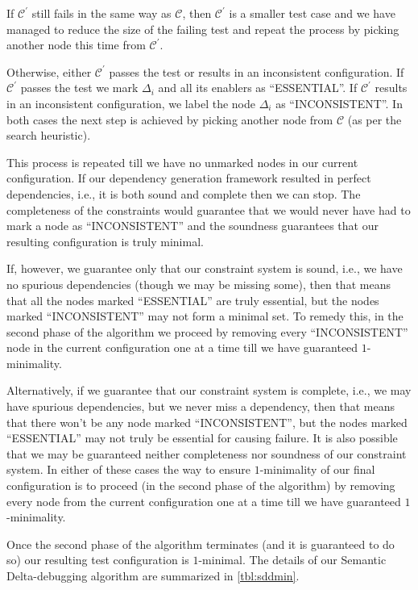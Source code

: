 \documentclass[preprint]{acm_proc_article-sp}
\begin{document}
If $\mathcal{C}^{'}$ still fails in the same way as $\mathcal{C}$, then
$\mathcal{C}^{'}$ is a smaller test case and we have managed to reduce the size
of the failing test and repeat the process by picking another node this time
from $\mathcal{C}^{'}$. 

Otherwise, either $\mathcal{C}^{'}$ passes the test or results in an
inconsistent configuration. If $\mathcal{C}^{'}$ passes the test we mark
$\Delta_i$ and all its enablers as ``ESSENTIAL''. If $\mathcal{C}^{'}$ results
in an inconsistent configuration, we label the node $\Delta_i$ as
``INCONSISTENT''. In both cases the next step is achieved by picking another
node from $\mathcal{C}$ (as per the search heuristic).

This process is repeated till we have no unmarked nodes in our current
configuration. If our dependency generation framework resulted in perfect
dependencies, i.e., it is both sound and complete then we can stop. The
completeness of the constraints would guarantee that we would never have had to
mark a node as ``INCONSISTENT'' and the soundness guarantees that our resulting
configuration is truly minimal.

If, however, we guarantee only that our constraint system is sound, i.e., we
have no spurious dependencies (though we may be missing some), then that means
that all the nodes marked ``ESSENTIAL'' are truly essential, but the nodes
marked ``INCONSISTENT'' may not form a minimal set. To remedy this, in the
second phase of the algorithm we proceed by removing every ``INCONSISTENT'' node
in the current configuration one at a time till we have guaranteed
$1$-minimality.

Alternatively, if we guarantee that our constraint system is complete, i.e., we
may have spurious dependencies, but we never miss a dependency, then that means
that there won't be any node marked ``INCONSISTENT'', but the nodes marked
``ESSENTIAL'' may not truly be essential for causing failure. It is also
possible that we may be guaranteed neither completeness nor soundness of our
constraint system. In either of these cases the way to ensure $1$-minimality of
our final configuration is to proceed (in the second phase of the algorithm) by
removing every node from the current configuration one at a time till we have
guaranteed $1$-minimality.

Once the second phase of the algorithm terminates (and it is guaranteed to do
so) our resulting test configuration is $1$-minimal. The details of our Semantic
Delta-debugging algorithm are summarized in \autoref{tbl:sddmin}.
\end{document}
